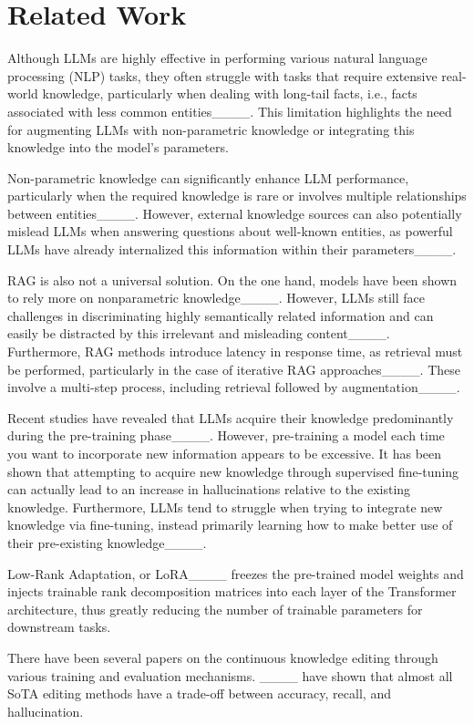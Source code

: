 \section{Related Work}
Although LLMs are highly effective in performing various natural language processing (NLP) tasks, they often struggle with tasks that require extensive real-world knowledge, particularly when dealing with long-tail facts, i.e., facts associated with less common entities____. This limitation highlights the need for augmenting LLMs with non-parametric knowledge or integrating this knowledge into the model's parameters.

Non-parametric knowledge can significantly enhance LLM performance, particularly when the required knowledge is rare or involves multiple relationships between entities____.  However, external knowledge sources can also potentially mislead LLMs when answering questions about well-known entities, as powerful LLMs have already internalized this information within their parameters____.

RAG is also not a universal solution. %
On the one hand, models have been shown to rely more on nonparametric knowledge____. However, LLMs still face challenges in discriminating highly semantically related information and can easily be distracted by this irrelevant and misleading content____. Furthermore, RAG methods introduce latency in response time, as retrieval must be performed, particularly in the case of iterative RAG approaches____. These involve a multi-step process, including retrieval followed by augmentation____.


Recent studies have revealed that LLMs acquire their knowledge predominantly during the pre-training phase____. However, pre-training a model each time you want to incorporate new information appears to be excessive. It has been shown that attempting to acquire new knowledge through supervised fine-tuning can actually lead to an increase in hallucinations relative to the existing knowledge. Furthermore, LLMs tend to struggle when trying to integrate new knowledge via fine-tuning, instead primarily learning how to make better use of their pre-existing knowledge____. 

Low-Rank Adaptation, or LoRA____ freezes the pre-trained model weights and injects trainable rank decomposition matrices into each layer of the Transformer architecture, thus greatly reducing the number of trainable parameters for downstream tasks.

There have been several papers on the continuous knowledge editing through various training and evaluation mechanisms. ____ have shown that almost all SoTA editing methods have a trade-off between accuracy, recall, and hallucination.